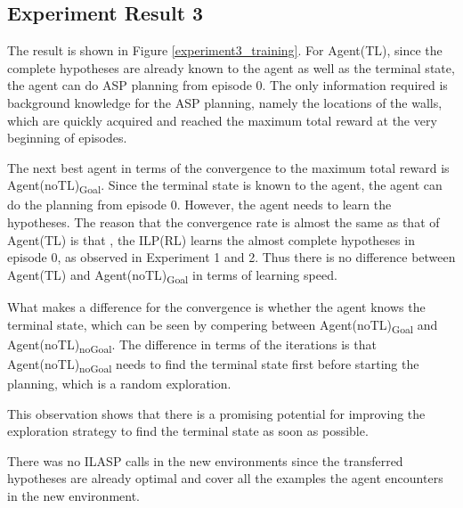 

\subsection{Experiment Result 3}
The result is shown in Figure \ref{experiment3_training}.
For Agent(TL), since the complete hypotheses are already known to the agent as well as the terminal state, the agent can do ASP planning from episode 0.
The only information required is background knowledge for the ASP planning, namely the locations of the walls, which are quickly acquired and reached the maximum total reward at the very beginning of episodes.

The next best agent in terms of the convergence to the maximum total reward is Agent(noTL)\textsubscript{Goal}. Since the terminal state is known to the agent, 
the agent can do the planning from episode 0. However, the agent needs to learn the hypotheses. The reason that the convergence rate is almost the same as that of Agent(TL) is that
, the ILP(RL) learns the almost complete hypotheses in episode 0, as observed in Experiment 1 and 2. 
Thus there is no difference between Agent(TL) and Agent(noTL)\textsubscript{Goal} in terms of learning speed. 

What makes a difference for the convergence is whether the agent knows the terminal state, which can be seen by compering between Agent(noTL)\textsubscript{Goal} and Agent(noTL)\textsubscript{noGoal}.
The difference in terms of the iterations is that Agent(noTL)\textsubscript{noGoal} needs to find the terminal state first before starting the planning, which is a random exploration.

This observation shows that there is a promising potential for improving the exploration strategy to find the terminal state as soon as possible.

There was no ILASP calls in the new environments since the transferred hypotheses are already optimal and cover all the examples the agent encounters in the new environment.

